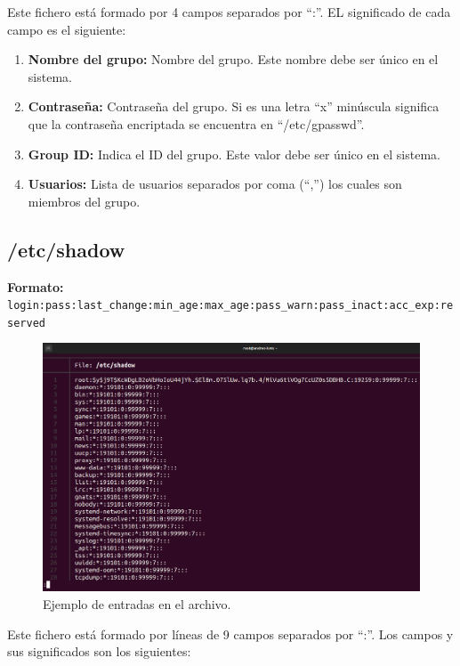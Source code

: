 \documentclass{article}
\begin{document}
\bigskip

Este fichero está formado por 4 campos separados por ``:''. EL significado de cada campo es el siguiente:

\begin{enumerate}
    \item \textbf{Nombre del grupo: }Nombre del grupo. Este nombre debe ser único en el sistema.
    
    \item \textbf{Contraseña: }Contraseña del grupo. Si es una letra ``x'' minúscula significa que la contraseña encriptada se encuentra en ``/etc/gpasswd''.
    \item \textbf{Group ID: }Indica el ID del grupo. Este valor debe ser único en el sistema.
    \item \textbf{Usuarios: }Lista de usuarios separados por coma (``,'') los cuales son miembros del grupo. 
\end{enumerate}

\subsection*{/etc/shadow}
\textbf{Formato: }\verb|login:pass:last_change:min_age:max_age:pass_warn:pass_inact:acc_exp:reserved|

\begin{figure}[H]
    \includegraphics[width=\textwidth]{imagenes/shadowfile.png}
    \caption{Ejemplo de entradas en el archivo.}    
\end{figure}

\bigskip

Este fichero está formado por líneas de 9 campos separados por ``:''. Los campos y sus significados son los siguientes:
\end{document}
